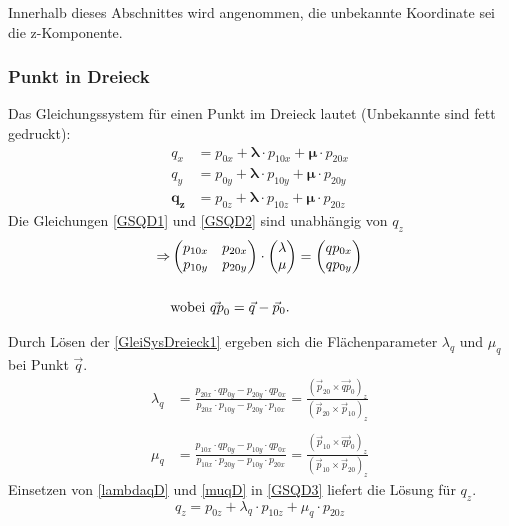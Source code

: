 Innerhalb dieses Abschnittes wird angenommen, die unbekannte Koordinate sei die z-Komponente.
\subsubsection{Punkt in Dreieck}
Das Gleichungssystem für einen Punkt im Dreieck lautet (Unbekannte sind fett gedruckt):
\begin{align}
	\label{GSQD1} q_{x} &= p_{0x} + \bm{\lambda} \cdot p_{10x} + \bm{\mu} \cdot p_{20x}\\
	\label{GSQD2} q_{y} &= p_{0y} + \bm{\lambda} \cdot p_{10y} + \bm{\mu} \cdot p_{20y} \\
	\label{GSQD3} \bm{q_{z}} &= p_{0z} + \bm{\lambda} \cdot p_{10z} + \bm{\mu} \cdot p_{20z}
\end{align}
Die Gleichungen \ref{GSQD1} und \ref{GSQD2} sind unabhängig von $q_{z}$
\begin{align}
	\label{GleiSysDreieck1}
	\Rightarrow &\begin{pmatrix}p_{10x} & p_{20x} \\ p_{10y} & p_{20y}\end{pmatrix} \cdot \begin{pmatrix}\lambda \\ \mu\end{pmatrix} = \begin{pmatrix}qp_{0x} \\ qp_{0y}\end{pmatrix} \\ \nonumber \\
	\nonumber & \text{wobei } \vec{qp}_{0} = \vec{q} - \vec{p}_{0}.
\end{align}

Durch Lösen der \cref{GleiSysDreieck1} ergeben sich die Flächenparameter $\lambda_{q}$ und  $\mu_{q}$ bei Punkt $\vec{q}$.
\begin{align}
	\label{lambdaqD}
	\lambda_{q} &= \frac{p_{20x} \cdot qp_{0y} - p_{20y} \cdot qp_{0x}}{p_{20x} \cdot p_{10y} - p_{20y} \cdot p_{10x}} = \frac{(\vec{p}_{20} \times \vec{qp}_{0})_{z}}{(\vec{p}_{20} \times \vec{p}_{10})_{z}}
	\\
	\nonumber \\
	\label{muqD}
	\mu_{q} &= \frac{p_{10x} \cdot qp_{0y} - p_{10y} \cdot qp_{0x}}{p_{10x} \cdot p_{20y} - p_{10y} \cdot p_{20x}} = \frac{(\vec{p}_{10} \times \vec{qp}_{0})_{z}}{(\vec{p}_{10} \times \vec{p}_{20})_{z}}
\end{align}
Einsetzen von \cref{lambdaqD} und \cref{muqD} in \cref{GSQD3} liefert die Lösung für $q_{z}$.
\begin{equation}
	\boxed{
		q_{z} = p_{0z} + \lambda_{q} \cdot p_{10z} + \mu_{q} \cdot p_{20z}
	}
\end{equation}
